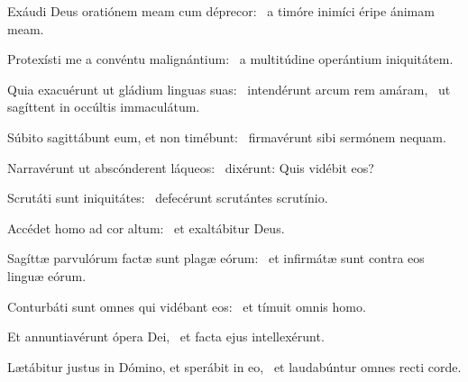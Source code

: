 \item Exáudi Deus oratiónem meam cum déprecor:~\psstar{} a timóre inimíci éripe ánimam meam.

\item Protexísti me a convéntu malignántium:~\psstar{} a multitúdine operántium iniquitátem.

\item Quia exacuérunt ut gládium linguas suas:~\pscross{} intendérunt arcum rem amáram,~\psstar{} ut sagíttent in occúltis immaculátum.

\item Súbito sagittábunt eum, et non timébunt:~\psstar{} firmavérunt sibi sermónem nequam.

\item Narravérunt ut abscónderent láqueos:~\psstar{} dixérunt: Quis vidébit eos?

\item Scrutáti sunt iniquitátes:~\psstar{} defecérunt scrutántes scrutínio.

\item Accédet homo ad cor altum:~\psstar{} et exaltábitur Deus.

\item Sagíttæ parvulórum factæ sunt plagæ eórum:~\psstar{} et infirmátæ sunt contra eos linguæ eórum.

\item Conturbáti sunt omnes qui vidébant eos:~\psstar{} et tímuit omnis homo.

\item Et annuntiavérunt ópera Dei,~\psstar{} et facta ejus intellexérunt.

\item Lætábitur justus in Dómino, et sperábit in eo,~\psstar{} et laudabúntur omnes recti corde.
